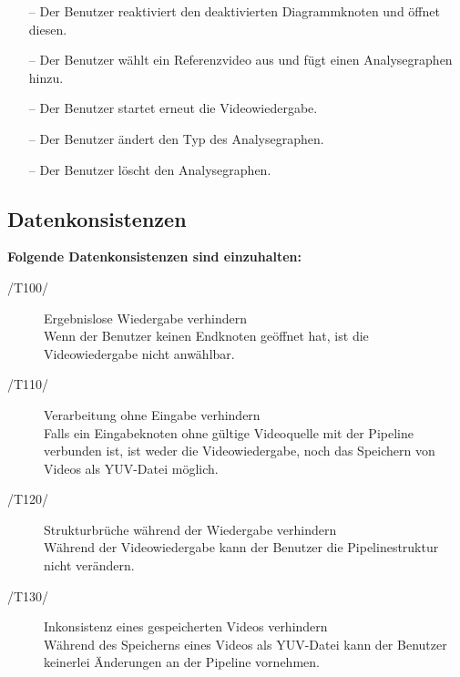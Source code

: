 \begin{description}
\begin{itemize}
			\item[--] Der Benutzer reaktiviert den deaktivierten Diagrammknoten und öffnet diesen.
			\item[--] Der Benutzer wählt ein Referenzvideo aus und fügt einen Analysegraphen hinzu.
			\item[--] Der Benutzer startet erneut die Videowiedergabe.
			\item[--] Der Benutzer ändert den Typ des Analysegraphen.
			\item[--] Der Benutzer löscht den Analysegraphen.
		\end{itemize}
\end{description}

\newpage

\subsection{Datenkonsistenzen}

\textbf{Folgende Datenkonsistenzen sind einzuhalten:}

\begin{description}
	\item[/T100/] Ergebnislose Wiedergabe verhindern ~\\
		Wenn der Benutzer keinen Endknoten geöffnet hat, ist die Videowiedergabe nicht anwählbar.
	\item[/T110/] Verarbeitung ohne Eingabe verhindern ~\\
		Falls ein Eingabeknoten ohne gültige Videoquelle mit der Pipeline verbunden ist, ist weder die Videowiedergabe, noch das Speichern von Videos als YUV-Datei möglich.
	\item[/T120/] Strukturbrüche während der Wiedergabe verhindern ~\\
		Während der Videowiedergabe kann der Benutzer die Pipelinestruktur nicht verändern.
	\item[/T130/] Inkonsistenz eines gespeicherten Videos verhindern ~\\
		Während des Speicherns eines Videos als YUV-Datei kann der Benutzer keinerlei Änderungen an der Pipeline vornehmen.
\end{description}
